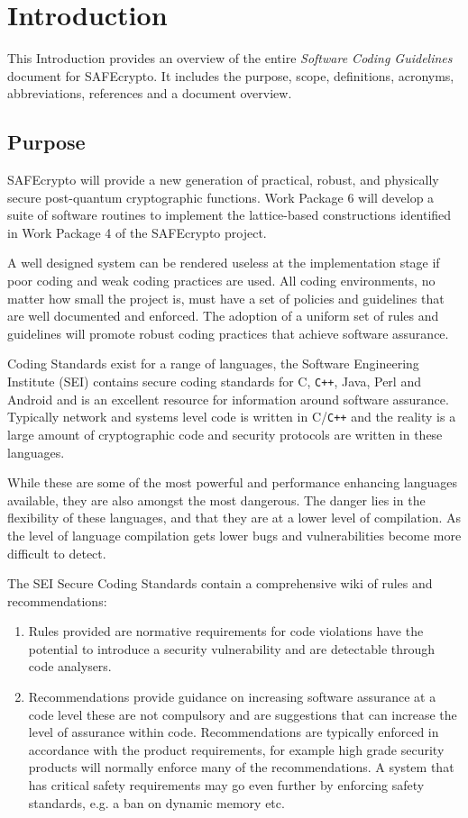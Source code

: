 \chapter{Introduction}
\label{ch_introduction}

This Introduction provides an overview of the entire \textit{Software Coding Guidelines} document for SAFEcrypto.
It includes the purpose, scope, definitions, acronyms, abbreviations, references and a document overview.

\section{Purpose}
SAFEcrypto will provide a new generation of practical, robust, and physically secure post-quantum cryptographic functions. Work Package 6 will develop a suite of software routines to implement the lattice-based constructions identified in Work Package 4 of the SAFEcrypto project.

A well designed system can be rendered useless at the implementation stage if poor coding and weak coding practices are used. All coding environments, no matter how small the project is, must have a set of policies and guidelines that are well documented and enforced. The adoption of a uniform set of rules and guidelines will promote robust coding practices that achieve software assurance.

Coding Standards exist for a range of languages, the Software Engineering Institute (SEI) contains secure coding standards for C, \verb!C++!, Java, Perl and Android and is an excellent resource for information around software assurance. Typically network and systems level code is written in C/\verb!C++! and the reality is a large amount of cryptographic code and security protocols are written in these languages.

While these are some of the most powerful and performance enhancing languages available, they are also amongst the most dangerous. The danger lies in the flexibility of these languages, and that they are at a lower level of compilation. As the level of language compilation gets lower bugs and vulnerabilities become more difficult to detect.

The SEI Secure Coding Standards contain a comprehensive wiki of rules and recommendations:

\begin{enumerate}
	\item Rules provided are normative requirements for code violations have the potential to introduce a security vulnerability and are detectable through code analysers.
	\item Recommendations provide guidance on increasing software assurance at a code level these are not compulsory and are suggestions that can increase the level of assurance within code. Recommendations are typically enforced in accordance with the product requirements, for example high grade security products will normally enforce many of the recommendations. A system that has critical safety requirements may go even further by enforcing safety standards, e.g. a ban on dynamic memory etc.
\end{enumerate}

